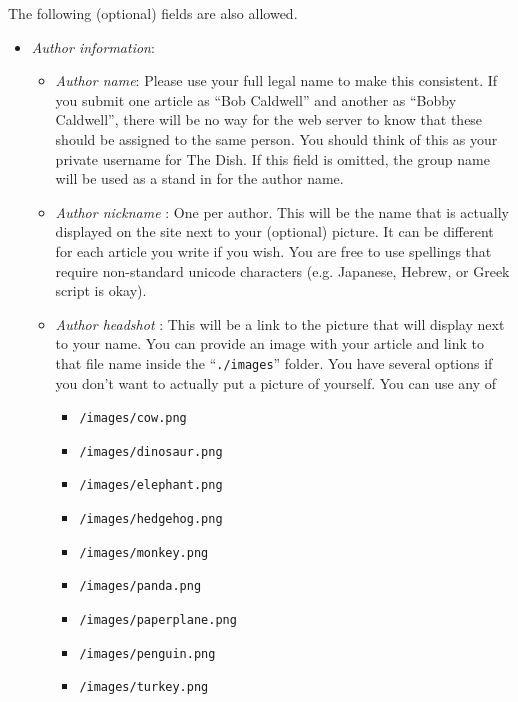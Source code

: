 \documentclass[paper=a4, fontsize=11pt]{scrartcl}
\numberwithin{equation}{section}        %
\numberwithin{figure}{section}            %
\numberwithin{table}{section}                %
\begin{document}
\noindent{}The following (optional) fields are also allowed.
\begin{itemize}
    \item \emph{Author information}:
        \begin{itemize}
            \item \emph{Author name}: Please use your full legal name to make this consistent. If
                you submit one article as ``Bob Caldwell'' and another as ``Bobby
                Caldwell'', there will be no way for the web server to know that
                these should be assigned to the same person. You should think of
                this as your private username for The Dish.
                If this field is omitted, the group name will be used as a stand in for
                the author name.
            \item \emph{Author nickname} : One per author. This will be the name that is
                actually displayed on the site next to your (optional) picture. It can
                be different for each article you write if you wish. You are
                free to use spellings that require non-standard unicode
                characters (e.g. Japanese, Hebrew, or Greek script is okay).
            \item \emph{Author headshot} : This will be a link to the picture
                that will display next to your name.  You can provide an image
                with your article and link to that file name inside the
                ``\texttt{./images}'' folder. You have several options if you
                don't want to actually put a picture of yourself. You can use
                any of
                \begin{itemize}
                    \item \texttt{/images/cow.png}
                    \item \texttt{/images/dinosaur.png}
                    \item \texttt{/images/elephant.png}
                    \item \texttt{/images/hedgehog.png}
                    \item \texttt{/images/monkey.png}
                    \item \texttt{/images/panda.png}
                    \item \texttt{/images/paperplane.png}
                    \item \texttt{/images/penguin.png}
                    \item \texttt{/images/turkey.png}

\end{itemize}
\end{itemize}
\end{itemize}
\end{document}
